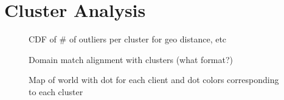 \section{Cluster Analysis} \label{sect:analysis}


\begin{figure}
    \caption{CDF of \# of outliers per cluster for geo distance, etc}
\end{figure}

\begin{figure}
    \caption{Domain match alignment with clusters (what format?)}
\end{figure}

\begin{figure}
    \caption{Map of world with dot for each client and dot colors corresponding to each cluster}
\end{figure}

